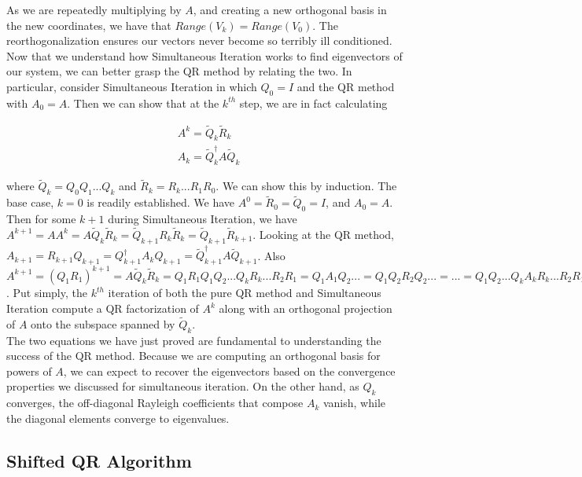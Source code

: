 \documentclass[11pt]{article}
\begin{document}
As we are repeatedly multiplying by $A$, and creating a new orthogonal basis in the new coordinates, we have that $Range(V_k) = Range(V_0)$. The reorthogonalization ensures our vectors never become so terribly ill conditioned. \\

Now that we understand how Simultaneous Iteration works to find eigenvectors of our system, we can better grasp the QR method by relating the two. In particular, consider Simultaneous Iteration in which $Q_0 = I$ and the QR method with $A_0 = A$. Then we can show that at the $k^{th}$ step, we are in fact calculating

\begin{align*}
  &A^k = \tilde{Q}_k \tilde{R}_k \\
  &A_k = \tilde{Q}_k^\dagger A \tilde{Q}_k
\end{align*}

where $\tilde{Q}_k = Q_0 Q_1 ... Q_k$ and $\tilde{R}_k = R_k...R_1R_0$. We can show this by induction. The base case, $k=0$ is readily established. We have $A^0 = \tilde{R}_0 = \tilde{Q}_0 = I$, and $A_0 = A$. Then for some $k+1$ during Simultaneous Iteration, we have $A^{k+1} = A A^k = A \tilde{Q}_k \tilde{R}_k = \tilde{Q}_{k+1} R_k \tilde{R}_k = \tilde{Q}_{k+1}\tilde{R}_{k+1}$. Looking at the QR method, $A_{k+1} = R_{k+1} Q_{k+1} = Q^\dagger_{k+1} A_k Q_{k+1} = \tilde{Q}^\dagger_{k+1} A \tilde{Q}_{k+1}$. Also $A^{k+1} = (Q_1 R_1)^{k+1} = A \tilde{Q}_k \tilde{R}_k = Q_1 R_1 Q_1 Q_2... Q_kR_k...R_2R_1 = Q_1 A_1 Q_2... = Q_1 Q_2 R_2 Q_2... = ... = Q_1Q_2 ... Q_k A_k R_k...R_2R_1 = \tilde{Q}_{k+1} \tilde{R}_{k+1}$. Put simply, the $k^{th}$ iteration of both the pure QR method and Simultaneous Iteration compute a QR factorization of $A^k$ along with an orthogonal projection of $A$ onto the subspace spanned by $\tilde{Q}_k$. \\

The two equations we have just proved are fundamental to understanding the success of the QR method. Because we are computing an orthogonal basis for powers of $A$, we can expect to recover the eigenvectors based on the convergence properties we discussed for simultaneous iteration. On the other hand, as $Q_k$ converges, the off-diagonal Rayleigh coefficients that compose $A_k$ vanish, while the diagonal elements converge to eigenvalues.

\subsection{Shifted QR Algorithm}
\end{document}
